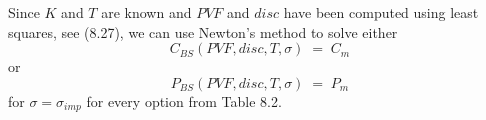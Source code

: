 Since $K$ and $T$ are known and $PVF$ and $disc$ have been computed using least
squares, see (8.27), we can use Newton's method to solve either
\begin{equation}
C_{BS}(PVF,disc,T,\sigma) \;=\; C_m
\end{equation}
or
\begin{equation}
P_{BS}(PVF,disc,T,\sigma) \;=\; P_m
\end{equation}
for $\sigma = \sigma_{imp}$ for every option from Table 8.2.
